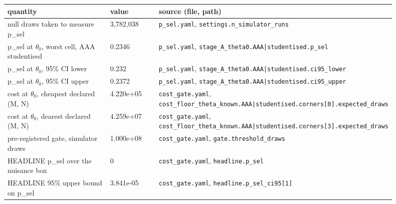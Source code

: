 \begin{longtable}{p{0.35\linewidth} p{0.14\linewidth} p{0.41\linewidth}}
\toprule
quantity & value & source (file, path) \\
\midrule
\endhead
null draws taken to measure p\_sel & 3,782,038 & \texttt{\footnotesize p\_\allowbreak{}sel.\allowbreak{}yaml}, \texttt{\footnotesize settings.\allowbreak{}n\_\allowbreak{}simulator\_\allowbreak{}runs} \\
p\_sel at $\theta_0$, worst cell, AAA studentised & 0.2346 & \texttt{\footnotesize p\_\allowbreak{}sel.\allowbreak{}yaml}, \texttt{\footnotesize stage\_\allowbreak{}A\_\allowbreak{}theta0.\allowbreak{}AAA|\allowbreak{}studentised.\allowbreak{}p\_\allowbreak{}sel} \\
p\_sel at $\theta_0$, 95\% CI lower & 0.232 & \texttt{\footnotesize p\_\allowbreak{}sel.\allowbreak{}yaml}, \texttt{\footnotesize stage\_\allowbreak{}A\_\allowbreak{}theta0.\allowbreak{}AAA|\allowbreak{}studentised.\allowbreak{}ci95\_\allowbreak{}lower} \\
p\_sel at $\theta_0$, 95\% CI upper & 0.2372 & \texttt{\footnotesize p\_\allowbreak{}sel.\allowbreak{}yaml}, \texttt{\footnotesize stage\_\allowbreak{}A\_\allowbreak{}theta0.\allowbreak{}AAA|\allowbreak{}studentised.\allowbreak{}ci95\_\allowbreak{}upper} \\
cost at $\theta_0$, cheapest declared (M, N) & 4.220e+05 & \texttt{\footnotesize cost\_\allowbreak{}gate.\allowbreak{}yaml}, \texttt{\footnotesize cost\_\allowbreak{}floor\_\allowbreak{}theta\_\allowbreak{}known.\allowbreak{}AAA|\allowbreak{}studentised.\allowbreak{}corners[0].\allowbreak{}expected\_\allowbreak{}draws} \\
cost at $\theta_0$, dearest declared (M, N) & 4.259e+07 & \texttt{\footnotesize cost\_\allowbreak{}gate.\allowbreak{}yaml}, \texttt{\footnotesize cost\_\allowbreak{}floor\_\allowbreak{}theta\_\allowbreak{}known.\allowbreak{}AAA|\allowbreak{}studentised.\allowbreak{}corners[3].\allowbreak{}expected\_\allowbreak{}draws} \\
pre-registered gate, simulator draws & 1.000e+08 & \texttt{\footnotesize cost\_\allowbreak{}gate.\allowbreak{}yaml}, \texttt{\footnotesize gate.\allowbreak{}threshold\_\allowbreak{}draws} \\
HEADLINE p\_sel over the nuisance box & 0 & \texttt{\footnotesize cost\_\allowbreak{}gate.\allowbreak{}yaml}, \texttt{\footnotesize headline.\allowbreak{}p\_\allowbreak{}sel} \\
HEADLINE 95\% upper bound on p\_sel & 3.841e-05 & \texttt{\footnotesize cost\_\allowbreak{}gate.\allowbreak{}yaml}, \texttt{\footnotesize headline.\allowbreak{}p\_\allowbreak{}sel\_\allowbreak{}ci95[1]} \\

\end{longtable}
